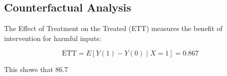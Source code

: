 \subsection{Counterfactual Analysis}

The Effect of Treatment on the Treated (ETT) measures the benefit of intervention for harmful inputs:

\begin{equation}
\text{ETT} = E[Y(1) - Y(0) \mid X=1] = 0.867
\end{equation}

This shows that 86.7%
